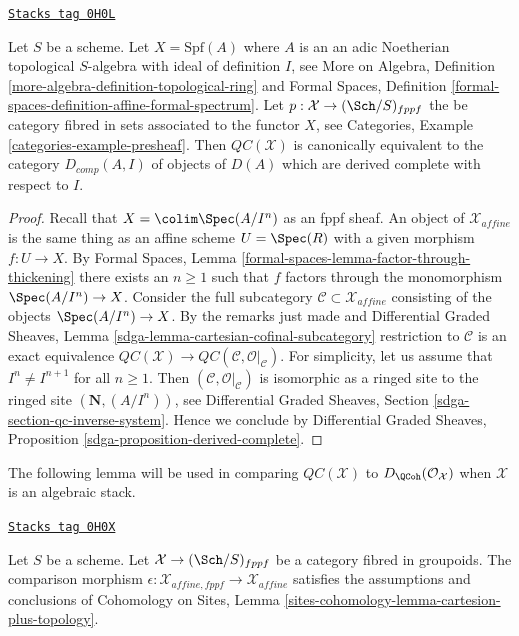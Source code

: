 \begin{proposition}
\label{stacks-sheaves-proposition-QC-derived-complete}
\href{https://stacks.math.columbia.edu/tag/0H0L}{\texttt{Stacks tag 0H0L}}

Let $S$ be a scheme. Let $X = \text{Spf}(A)$ where $A$ is an
an adic Noetherian topological $S$-algebra with ideal of definition $I$, see
More on Algebra, Definition \ref{more-algebra-definition-topological-ring}
and Formal Spaces, Definition
\ref{formal-spaces-definition-affine-formal-spectrum}.
Let $p : \mathcal{X} \to (\Sch/S)_{fppf}$
the be category fibred in sets associated to the functor $X$, see
Categories, Example \ref{categories-example-presheaf}.
Then $\mathit{QC}(\mathcal{X})$ is canonically equivalent to the
category $D_{comp}(A, I)$ of objects of $D(A)$ which are
derived complete with respect to $I$.
\end{proposition}

\begin{proof}
Recall that $X = \colim \Spec(A/I^n)$ as an fppf sheaf.
An object of $\mathcal{X}_{affine}$ is the same thing
as an affine scheme $U = \Spec(R)$ with a given morphism $f : U \to X$.
By Formal Spaces, Lemma \ref{formal-spaces-lemma-factor-through-thickening}
there exists an $n \geq 1$ such that
$f$ factors through the monomorphism $\Spec(A/I^n) \to X$.
Consider the full subcategory
$\mathcal{C} \subset \mathcal{X}_{affine}$ consisting of
the objects $\Spec(A/I^n) \to X$.
By the remarks just made and Differential Graded Sheaves, Lemma
\ref{sdga-lemma-cartesian-cofinal-subcategory}
restriction to $\mathcal{C}$ is an exact equivalence
$\mathit{QC}(\mathcal{X}) \to
\mathit{QC}(\mathcal{C}, \mathcal{O}|_\mathcal{C})$.
For simplicity, let us assume that
$I^n \not = I^{n + 1}$ for all $n \geq 1$.
Then $(\mathcal{C}, \mathcal{O}|_\mathcal{C})$ is isomorphic
as a ringed site to the ringed site $(\mathbf{N}, (A/I^n))$, see
Differential Graded Sheaves, Section
\ref{sdga-section-qc-inverse-system}.
Hence we conclude by Differential Graded Sheaves, Proposition
\ref{sdga-proposition-derived-complete}.
\end{proof}

The following lemma will be used in comparing $\mathit{QC}(\mathcal{X})$
to $D_\QCoh(\mathcal{O}_\mathcal{X})$ when $\mathcal{X}$ is an algebraic stack.

\begin{lemma}
\label{stacks-sheaves-lemma-QC-compare-fppf}
\href{https://stacks.math.columbia.edu/tag/0H0X}{\texttt{Stacks tag 0H0X}}

Let $S$ be a scheme. Let $\mathcal{X} \to (\Sch/S)_{fppf}$ be a category
fibred in groupoids. The comparison morphism
$\epsilon : \mathcal{X}_{affine, fppf} \to \mathcal{X}_{affine}$
satisfies the assumptions and conclusions of Cohomology on Sites, Lemma
\ref{sites-cohomology-lemma-cartesion-plus-topology}.
\end{lemma}

